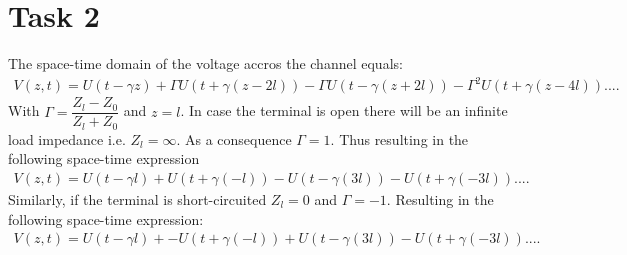 \documentclass[final]{scrreprt} %
\begin{document}
\section*{Task 2}
The space-time domain of the voltage accros the channel equals:
\begin{align*}
V(z,t) = U(t-\gamma z) + \Gamma U(t + \gamma(z-2l)) - \Gamma U(t-\gamma(z+2l)) - \Gamma^2U(t+\gamma(z-4l))....
\end{align*}
With $\Gamma = \dfrac{Z_l - Z_0}{Z_l + Z_0}$ and $z = l$. In case the terminal is open there will be an infinite load impedance i.e. $Z_l = \infty$. As a consequence $\Gamma = 1$. Thus resulting in the following space-time expression 
\begin{align*}
V(z,t) = U(t-\gamma l) + U(t + \gamma(-l)) - U(t-\gamma(3l)) - U(t+\gamma(-3l))....
\end{align*}
Similarly, if the terminal is short-circuited $Z_l = 0$ and $\Gamma = -1$. Resulting in the following space-time expression:
\begin{align*}
V(z,t) = U(t-\gamma l) + -U(t + \gamma(-l)) + U(t-\gamma(3l)) - U(t+\gamma(-3l))....
\end{align*}
\end{document}
